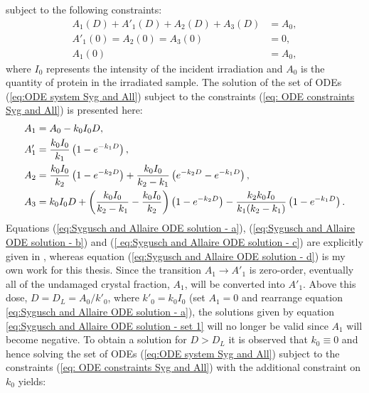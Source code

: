 subject to the following constraints:
\begin{subequations}
\begin{align}
A_1(D) + A'_1(D) + A_2(D) + A_3(D) &= A_0, \\
A'_1(0) = A_2(0) = A_3(0)          &= 0,   \\
A_1(0)                             &= A_0,
\end{align}
\label{eq: ODE constraints Syg and All}
\end{subequations}
where $I_0$ represents the intensity of the incident irradiation and $A_0$ is the quantity of protein in the irradiated sample.
\newline
The solution of the set of ODEs (\ref{eq:ODE system Syg and All}) subject to the constraints (\ref{eq: ODE constraints Syg and All}) is presented here:
\begin{subequations}
\begin{align}
A_1  &= A_0 - k_0 I_0 D, \label{eq:Sygusch and Allaire ODE solution - a}\\
A'_1 &= \frac{k_0 I_0}{k_1} \left( 1 - e^{-k_1 D}\right), \label{eq:Sygusch and Allaire ODE solution - b}\\
A_2  &= \frac{k_0 I_0}{k_2} \left( 1 - e^{-k_2 D}\right) + \frac{k_0 I_0}{k_2 - k_1} \left(e^{-k_2 D} - e^{-k_1 D}\right), \label{
eq:Sygusch and Allaire ODE solution - c}\\
A_3  &= k_0 I_0 D + \left(\frac{k_0 I_0}{k_2 - k_1} - \frac{k_0 I_0}{k_2}\right)\left( 1 - e^{-k_2 D}\right) - \frac{k_2 k_0 I_0}{k_1(k_2 - k_1)}\left(1 - e^{-k_1 D} \right) \label{eq:Sygusch and Allaire ODE solution - d}.
\end{align}
\label{eq:Sygusch and Allaire ODE solution - set 1}
\end{subequations}
Equations (\ref{eq:Sygusch and Allaire ODE solution - a}), (\ref{eq:Sygusch and Allaire ODE solution - b}) and (\ref{
eq:Sygusch and Allaire ODE solution - c}) are explicitly given in \cite{sygusch1988}, whereas equation (\ref{eq:Sygusch and Allaire ODE solution - d}) is my own work for this thesis.
Since the transition $A_1 \rightarrow A'_1$ is zero-order, eventually all of the undamaged crystal fraction, $A_1$, will be converted into $A'_1$.
Above this dose, $D = D_L = A_0/k'_0$, where $k'_0 = k_0 I_0$ (set $A_1 = 0$ and rearrange equation \ref{eq:Sygusch and Allaire ODE solution - a}), the solutions given by equation \ref{eq:Sygusch and Allaire ODE solution - set 1} will no longer be valid since $A_1$ will become negative.
To obtain a solution for $D > D_L$ it is observed that $k_0 \equiv 0$ and hence solving the set of ODEs (\ref{eq:ODE system Syg and All}) subject to the constraints (\ref{eq: ODE constraints Syg and All}) with the additional constraint on $k_0$ yields:
